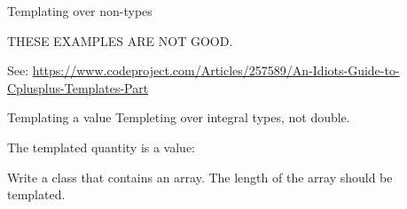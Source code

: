  {Templating over non-types}

THESE EXAMPLES ARE NOT GOOD.

See:
\url{https://www.codeproject.com/Articles/257589/An-Idiots-Guide-to-Cplusplus-Templates-Part}

\begin{block}{Templating a value}
  Templeting over integral types, not double.

  The templated quantity is a value:
\end{block}

\begin{exercise}
  Write a class that contains an array. The length of the array should
  be templated.
\end{exercise}
